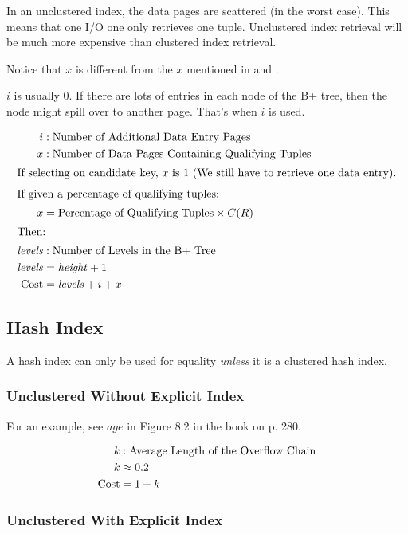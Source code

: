 \documentclass{article}
\begin{document}
In an unclustered index, the data pages are scattered (in the worst
case). This means that one I/O one only retrieves one
tuple. Unclustered index retrieval will be much more expensive than
clustered index retrieval.

Notice that \(x\) is different from the \(x\) mentioned in
 and .

\(i\) is usually 0. If there are lots of entries in each node of the
B+ tree, then the node might spill over to another page. That's when
\(i\) is used.

\begin{align}
  i &: \text{Number of Additional Data Entry Pages} \notag \\
  x &: \text{Number of Data Pages Containing Qualifying Tuples} \notag \\
  \intertext{If selecting on candidate key, \(x\) is 1 (We still have to retrieve one data entry).}
  \intertext{If given a percentage of qualifying tuples:}
  x &= \text{Percentage of Qualifying Tuples} \times C(R) \\
  \intertext{Then:}
  \mathit{levels} &: \text{Number of Levels in the B+ Tree} \notag \\
  \mathit{levels} &= \mathit{height} + 1 \\
  \text{Cost} &= \mathit{levels} + i + x
\end{align}

\subsection{Hash Index}

A hash index can only be used for equality \textit{unless} it is a clustered hash index.

\subsubsection{Unclustered Without Explicit Index}

For an example, see \(age\) in Figure 8.2 in the book on p. 280.

\begin{align}
  k &: \text{Average Length of the Overflow Chain} \notag \\
  k &\approx 0.2 \\
  \text{Cost} &= 1 + k
\end{align}

\subsubsection{Unclustered With Explicit Index}
\end{document}
